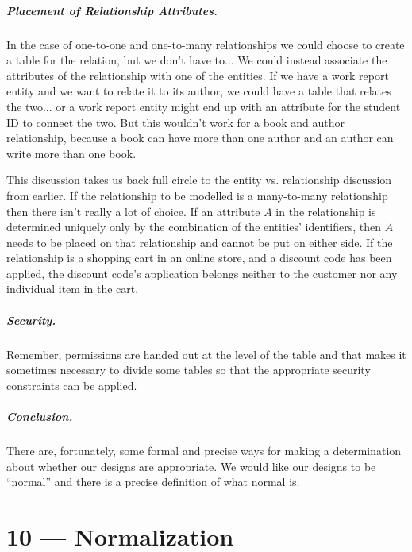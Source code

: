 \documentclass[a4paper]{report}
\begin{document}
\paragraph{Placement of Relationship Attributes.} 

In the case of one-to-one and one-to-many relationships we could choose to create a table for the relation, but we don't have to... We could instead associate the attributes of the relationship with one of the entities. If we have a work report entity and we want to relate it to its author, we could have a table that relates the two... or a work report entity might end up with an attribute for the student ID to connect the two. But this wouldn't work for a book and author relationship, because a book can have more than one author and an author can write more than one book.

This discussion takes us back full circle to the entity vs. relationship discussion from earlier. If the relationship to be modelled is a many-to-many relationship then there isn't really a lot of choice. If an attribute $A$ in the relationship is determined uniquely only by the combination of the entities' identifiers, then $A$ needs to be placed on that relationship and cannot be put on either side. If the relationship is a shopping cart in an online store, and a discount code has been applied, the discount code's application belongs neither to the customer nor any individual item in the cart.

\paragraph{Security.} Remember, permissions are handed out at the level of the table and that makes it sometimes necessary to divide some tables so that the appropriate security constraints can be applied. 

\paragraph{Conclusion.} There are, fortunately, some formal and precise ways for making a determination about whether our designs are appropriate. We would like our designs to be ``normal'' and there is a precise definition of what normal is. 









\chapter*{10 --- Normalization}
\end{document}
